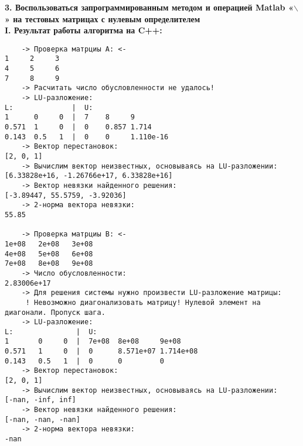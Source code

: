 \documentclass[a4paper]{article}
\begin{document}
{\Large{\textbf{3. Воспользоваться запрограммированным методом и операцией Matlab «$\backslash$» на тестовых матрицах с нулевым определителем}}}\\

{\large\bf I. Результат работы алгоритма на C++:}
{\singlespacing
\begin{verbatim}
    -> Проверка матрциы A: <-
1     2     3
4     5     6
7     8     9
    -> Расчитать число обусловленности не удалось!
    -> LU-разложение:
L:              |  U:
1      0     0  |  7    8     9
0.571  1     0  |  0    0.857 1.714
0.143  0.5   1  |  0    0     1.110e-16
    -> Вектор перестановок:
[2, 0, 1]
    -> Вычислим вектор неизвестных, основываясь на LU-разложении:
[6.33828e+16, -1.26766e+17, 6.33828e+16]
    -> Вектор невязки найденного решения:
[-3.89447, 55.5759, -3.92036]
    -> 2-норма вектора невязки:
55.85

    -> Проверка матрциы B: <-
1e+08   2e+08   3e+08
4e+08   5e+08   6e+08
7e+08   8e+08   9e+08
    -> Число обусловленности:
2.83006e+17
    -> Для решения системы нужно произвести LU-разложение матрицы:
     ! Невозможно диагонализовать матрицу! Нулевой элемент на диагонали. Пропуск шага.
    -> LU-разложение:
L:               |  U:
1       0     0  |  7e+08  8e+08     9e+08
0.571   1     0  |  0      8.571e+07 1.714e+08
0.143   0.5   1  |  0      0         0
    -> Вектор перестановок:
[2, 0, 1]
    -> Вычислим вектор неизвестных, основываясь на LU-разложении:
[-nan, -inf, inf]
    -> Вектор невязки найденного решения:
[-nan, -nan, -nan]
    -> 2-норма вектора невязки:
-nan
\end{verbatim}}
\end{document}
